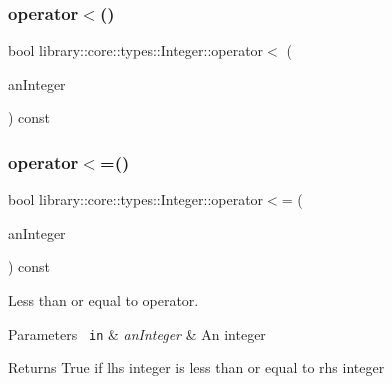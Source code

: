 \subsubsection{\texorpdfstring{operator$<$()}{operator<()}\hspace{0.1cm}{\footnotesize\ttfamily [2/2]}}
{\footnotesize\ttfamily bool library\+::core\+::types\+::\+Integer\+::operator$<$ (\begin{DoxyParamCaption}\item[{const \mbox{\hyperlink{classlibrary_1_1core_1_1types_1_1_integer_a623afb1580f870fd8a1997b1c12c917d}{Integer\+::\+Value\+Type}} \&}]{an\+Integer }\end{DoxyParamCaption}) const}

\mbox{\label{classlibrary_1_1core_1_1types_1_1_integer_a57c084e8ca66e33675a706868b555962}} 
\subsubsection{\texorpdfstring{operator$<$=()}{operator<=()}\hspace{0.1cm}{\footnotesize\ttfamily [1/2]}}
{\footnotesize\ttfamily bool library\+::core\+::types\+::\+Integer\+::operator$<$= (\begin{DoxyParamCaption}\item[{const \mbox{\hyperlink{classlibrary_1_1core_1_1types_1_1_integer}{Integer}} \&}]{an\+Integer }\end{DoxyParamCaption}) const}



Less than or equal to operator. 


\begin{DoxyCode}{0}
\end{DoxyCode}



\begin{DoxyParams}[1]{Parameters}
\mbox{\texttt{ in}}  & {\em an\+Integer} & An integer \\
\hline
\end{DoxyParams}
\begin{DoxyReturn}{Returns}
True if lhs integer is less than or equal to rhs integer 
\end{DoxyReturn}
\mbox{\label{classlibrary_1_1core_1_1types_1_1_integer_a09f6844cd7557f087116a50869765eaa}} 
